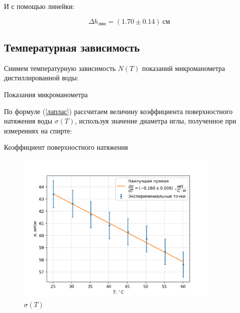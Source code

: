 \documentclass[a4paper,12pt]{article} %
\begin{document}
И с помощью линейки:

\begin{equation}\label{h_лин}
	\Delta h_{лин} = (1.70 \pm 0.14) \ см
\end{equation}

\subsection*{Температурная зависимость}

Снимем температурную зависимость $N(T)$ показаний микроманометра дистиллированной воды:

\begin{table}[ht!]
	\centering
	
	\caption{Показания микроманометра}
\end{table}

По формуле (\ref{лаплас}) рассчитаем величину коэффициента поверхностного натяжения воды $\sigma(T)$, используя значение диаметра иглы, полученное при измерениях на спирте:

\begin{table}[ht!]
	\centering
	
	\caption{Коэффициент поверхностного натяжения}
\end{table}

\newpage


\begin{figure}[h!]
\begin{center}
\includegraphics[width=0.875\textwidth]{8.png}
\end{center}
\caption{$\sigma(T)$}\label{sigma(T)}
\end{figure}
\end{document}
